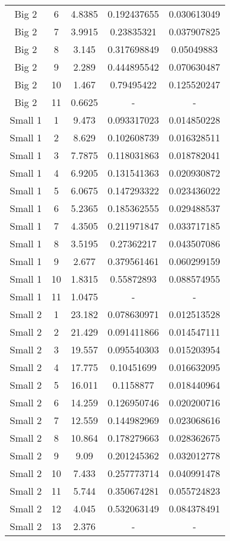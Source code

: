 \begin{longtable}{ccccc}
    Big 2 & 6 & 4.8385 & 0.192437655 & 0.030613049 \\
    Big 2 & 7 & 3.9915 & 0.23835321 & 0.037907825 \\
    Big 2 & 8 & 3.145 & 0.317698849 & 0.05049883 \\
    Big 2 & 9 & 2.289 & 0.444895542 & 0.070630487 \\
    Big 2 & 10 & 1.467 & 0.79495422 & 0.125520247 \\
    Big 2 & 11 & 0.6625 & - & - \\
    Small 1 & 1 & 9.473 & 0.093317023 & 0.014850228 \\
    Small 1 & 2 & 8.629 & 0.102608739 & 0.016328511 \\
    Small 1 & 3 & 7.7875 & 0.118031863 & 0.018782041 \\
    Small 1 & 4 & 6.9205 & 0.131541363 & 0.020930872 \\
    Small 1 & 5 & 6.0675 & 0.147293322 & 0.023436022 \\
    Small 1 & 6 & 5.2365 & 0.185362555 & 0.029488537 \\
    Small 1 & 7 & 4.3505 & 0.211971847 & 0.033717185 \\
    Small 1 & 8 & 3.5195 & 0.27362217 & 0.043507086 \\
    Small 1 & 9 & 2.677 & 0.379561461 & 0.060299159 \\
    Small 1 & 10 & 1.8315 & 0.55872893 & 0.088574955 \\
    Small 1 & 11 & 1.0475 & - & - \\
    Small 2 & 1 & 23.182 & 0.078630971 & 0.012513528 \\
    Small 2 & 2 & 21.429 & 0.091411866 & 0.014547111 \\
    Small 2 & 3 & 19.557 & 0.095540303 & 0.015203954 \\
    Small 2 & 4 & 17.775 & 0.10451699 & 0.016632095 \\
    Small 2 & 5 & 16.011 & 0.1158877 & 0.018440964 \\
    Small 2 & 6 & 14.259 & 0.126950746 & 0.020200716 \\
    Small 2 & 7 & 12.559 & 0.144982969 & 0.023068616 \\
    Small 2 & 8 & 10.864 & 0.178279663 & 0.028362675 \\
    Small 2 & 9 & 9.09 & 0.201245362 & 0.032012778 \\
    Small 2 & 10 & 7.433 & 0.257773714 & 0.040991478 \\
    Small 2 & 11 & 5.744 & 0.350674281 & 0.055724823 \\
    Small 2 & 12 & 4.045 & 0.532063149 & 0.084378491 \\
    Small 2 & 13 & 2.376 & - & - \\
\end{longtable}

